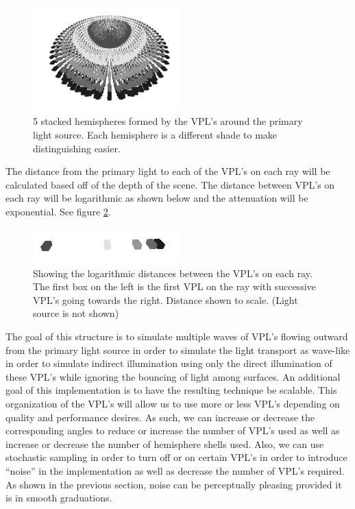 \begin{figure}[h!]
  \centering
    \includegraphics[width=0.5\textwidth]{Figure34_gray.jpg}
  \caption{5 stacked hemispheres formed by the VPL's around the primary light source. Each hemisphere is a different shade to make distinguishing easier.}
	\label{fig:3.4}
\end{figure}

The distance from the primary light to each of the VPL's on each ray will be calculated based off of the depth of the scene.  The distance between VPL's on each ray will be logarithmic as shown below and the attenuation will be exponential.  See figure \ref{fig:3.5}.

\begin{figure}[h!]
  \centering
    \includegraphics[width=0.5\textwidth]{Figure35_gray.jpg}
  \caption{Showing the logarithmic distances between the VPL's on each ray.  The first box on the left is the first VPL on the ray with successive VPL's going towards the right. Distance shown to scale. (Light source is not shown)}
	\label{fig:3.5}
\end{figure}

The goal of this structure is to simulate multiple waves of VPL's flowing outward from the primary light source in order to simulate the light transport as wave-like in order to simulate indirect illumination using only the direct illumination of these VPL's while ignoring the bouncing of light among surfaces.  An additional goal of this implementation is to have the resulting technique be scalable.  This organization of the VPL's will allow us to use more or less VPL's depending on quality and performance desires.  As such, we can increase or decrease the corresponding angles to reduce or increase the number of VPL's used as well as increase or decrease the number of hemisphere shells used.  Also, we can use stochastic sampling in order to turn off or on certain VPL's in order to introduce “noise” in the implementation as well as decrease the number of VPL's required.  As shown in the previous section, noise can be perceptually pleasing provided it is in smooth graduations.


